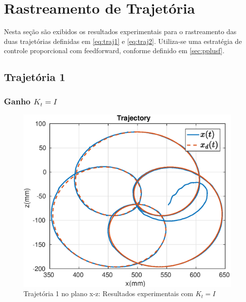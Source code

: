 \section{Rastreamento de Trajetória}

Nesta seção são exibidos os resultados experimentais para o rastreamento das duas trajetórias definidas em \eqref{eq:traj1} e \eqref{eq:traj2}. Utiliza-se uma estratégia de controle proporcional com feedforward, conforme definido em \ref{sec:pplusf}. 

\subsection{Trajetória 1}

\subsubsection{Ganho ${K}_t = {I}$}

\begin{figure}[H]
\centering
  \includegraphics[width=0.5\linewidth]{./img/traj_1_k1/traj.eps}
  \caption{Trajetória 1 no plano x-z: Resultados experimentais com ${K}_t = {I}$}
  \label{fig:sub1}
\end{figure}%

